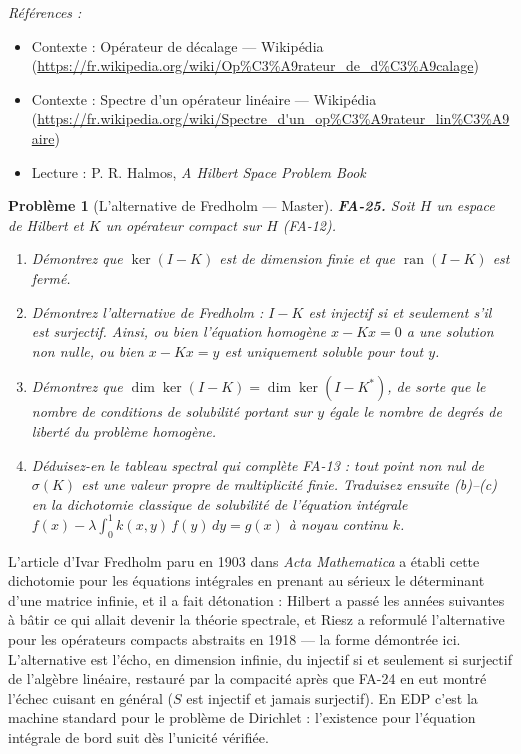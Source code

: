 \documentclass[11pt]{article}
\newtheorem{problem}{Problème}
\newenvironment{refs}{\par\small\noindent\emph{Références :}\begin{itemize}\setlength\itemsep{0pt}}{\end{itemize}\normalsize}
\begin{document}
\begin{refs}
\item Contexte : Opérateur de décalage --- Wikipédia (\url{https://fr.wikipedia.org/wiki/Op%C3%A9rateur_de_d%C3%A9calage})
\item Contexte : Spectre d'un opérateur linéaire --- Wikipédia (\url{https://fr.wikipedia.org/wiki/Spectre_d'un_op%C3%A9rateur_lin%C3%A9aire})
\item Lecture : P. R. Halmos, \textit{A Hilbert Space Problem Book}
\end{refs}

\bigskip

\begin{problem}[{L'alternative de Fredholm --- Master}]
\textbf{FA-25.} Soit $ H $ un espace de Hilbert et $ K $ un opérateur compact sur $ H $
(FA-12).
\begin{enumerate}
\item[(a)] Démontrez que $ \ker(I - K) $ est de dimension finie et que $ \operatorname{ran}(I - K) $ est
fermé.
\item[(b)] Démontrez l'\textit{alternative de Fredholm} : $ I - K $ est injectif si et seulement s'il est
surjectif. Ainsi, ou bien l'équation homogène $ x - Kx = 0 $ a une solution non nulle, ou bien
$ x - Kx = y $ est uniquement soluble pour tout $ y $.
\item[(c)] Démontrez que $ \dim \ker(I - K) = \dim \ker(I - K^{*}) $, de sorte que le nombre de conditions
de solubilité portant sur $ y $ égale le nombre de degrés de liberté du problème homogène.
\item[(d)] Déduisez-en le tableau spectral qui complète FA-13 : tout point non nul de $ \sigma(K) $ est une
valeur propre de multiplicité finie. Traduisez ensuite (b)--(c) en la dichotomie classique de
solubilité de l'équation intégrale
$ f(x) - \lambda \int_0^1 k(x,y)\,f(y)\,dy = g(x) $ à noyau continu $ k $.
\end{enumerate}

\end{problem}

\noindent L'article d'Ivar Fredholm paru en 1903 dans \textit{Acta Mathematica} a établi cette
dichotomie pour les équations intégrales en prenant au sérieux le déterminant d'une matrice infinie, et
il a fait détonation : Hilbert a passé les années suivantes à bâtir ce qui allait devenir la théorie
spectrale, et Riesz a reformulé l'alternative pour les opérateurs compacts abstraits en 1918 --- la forme
démontrée ici. L'alternative est l'écho, en dimension infinie, du \og{} injectif si et seulement si
surjectif \fg{} de l'algèbre linéaire, restauré par la compacité après que FA-24 en eut montré l'échec cuisant
en général ($ S $ est injectif et jamais surjectif). En EDP c'est la machine standard pour le problème
de Dirichlet : l'existence pour l'équation intégrale de bord suit dès l'unicité vérifiée.
\end{document}
